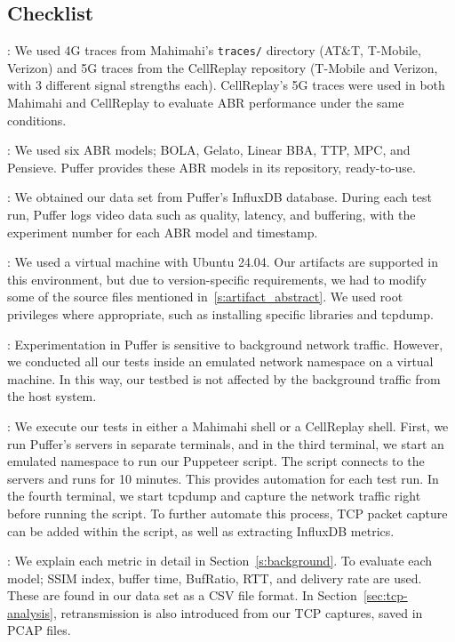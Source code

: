 \subsection{Checklist}

:
%
We used 4G traces from Mahimahi’s \texttt{traces/} directory (AT\&T, T-Mobile, Verizon) and 5G traces from the CellReplay repository (T-Mobile and Verizon, with 3 different signal strengths each). CellReplay's 5G traces were used in both Mahimahi and CellReplay to evaluate ABR performance under the same conditions.

:
%
We used six ABR models; BOLA, Gelato, Linear BBA, TTP, MPC, and Pensieve. Puffer provides these ABR models in its repository, ready-to-use.

:
%
We obtained our data set from Puffer's InfluxDB database. During each test run, Puffer logs video data such as quality, latency, and buffering, with the experiment number for each ABR model and timestamp.

:
%
We used a virtual machine with Ubuntu 24.04. Our artifacts are supported in this environment, but due to version-specific requirements, we had to modify some of the source files mentioned in~\ref{s:artifact_abstract}. We used root privileges where appropriate, such as installing specific libraries and tcpdump.

:
%
Experimentation in Puffer is sensitive to background network traffic. However, we conducted all our tests inside an emulated network namespace on a virtual machine. In this way, our testbed is not affected by the background traffic from the host system.

:
%
We execute our tests in either a Mahimahi shell or a CellReplay shell. First, we run Puffer's servers in separate terminals, and in the third terminal, we start an emulated namespace to run our Puppeteer script. The script connects to the servers and runs for 10 minutes. This provides automation for each test run. In the fourth terminal, we start tcpdump and capture the network traffic right before running the script. To further automate this process, TCP packet capture can be added within the script, as well as extracting InfluxDB metrics.

:
%
We explain each metric in detail in Section~\ref{s:background}. To evaluate each model; SSIM index, buffer time, BufRatio, RTT, and delivery rate are used. These are found in our data set as a CSV file format. In Section~\ref{sec:tcp-analysis}, retransmission is also introduced from our TCP captures, saved in PCAP files.

